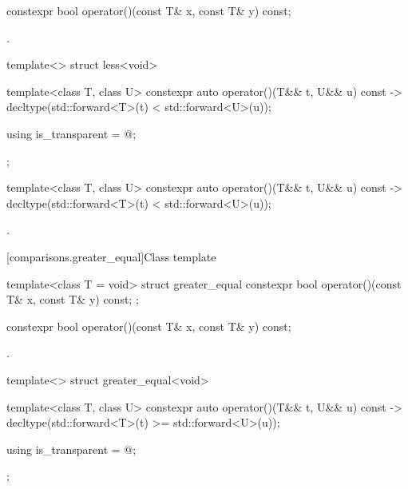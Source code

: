 %
\begin{itemdecl}
constexpr bool operator()(const T& x, const T& y) const;
\end{itemdecl}

\begin{itemdescr}
\pnum\returns {}.
\end{itemdescr}

%
\begin{itemdecl}
template<> struct less<void> {
  template<class T, class U> constexpr auto operator()(T&& t, U&& u) const
    -> decltype(std::forward<T>(t) < std::forward<U>(u));

  using is_transparent = @\unspec@;
};
\end{itemdecl}

%
\begin{itemdecl}
template<class T, class U> constexpr auto operator()(T&& t, U&& u) const
    -> decltype(std::forward<T>(t) < std::forward<U>(u));
\end{itemdecl}

\begin{itemdescr}
\pnum\returns {}.
\end{itemdescr}

[comparisons.greater_equal]{Class template }

%
\begin{itemdecl}
template<class T = void> struct greater_equal {
  constexpr bool operator()(const T& x, const T& y) const;
};
\end{itemdecl}

%
\begin{itemdecl}
constexpr bool operator()(const T& x, const T& y) const;
\end{itemdecl}

\begin{itemdescr}
\pnum\returns {}.
\end{itemdescr}

%
\begin{itemdecl}
template<> struct greater_equal<void> {
  template<class T, class U> constexpr auto operator()(T&& t, U&& u) const
    -> decltype(std::forward<T>(t) >= std::forward<U>(u));

  using is_transparent = @\unspec@;
};
\end{itemdecl}

